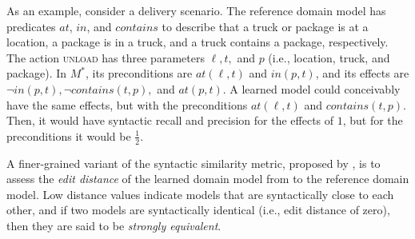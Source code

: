 \documentclass{article}
\theoremstyle{definition}
\theoremstyle{remark}
\newcommand{\realm}{{\ensuremath{M^*}}\xspace}
\newif\ifaddcomments
\newcommand{\roni}[1]{\ifaddcomments{\textcolor{red}{[Roni: #1]}}\fi}
\newcommand{\gregor}[1]{\ifaddcomments{\textcolor{orange}{[Gregor: #1]}}\fi}
\begin{document}
As an example, consider a delivery scenario.
The reference domain model has predicates $at$, $in$, and $contains$ to describe that a truck or package is at a location, a package is in a truck, and a truck contains a package, respectively.
The action \textsc{unload} has three parameters $\ell, t,$ and $p$ (i.e., location, truck, and package).
In $\realm$, its preconditions are $\textit{at}(\ell, t)$ and $\textit{in}(p,t)$, and its effects are $\neg \textit{in}(p,t), \neg \textit{contains}(t,p),$ and $\textit{at}(p,t)$.
A learned model could conceivably have the same effects, but with the preconditions $\textit{at}(\ell, t)$ and $\textit{contains}(t,p)$.
Then, it would have syntactic recall and precision for the effects of $1$, but for the preconditions it would be $\frac 1 2$.

A finer-grained variant of the syntactic similarity metric, proposed by \cite{chrpa2023comparing}, is to assess the \emph{edit distance} of the learned domain model from to the reference domain model. Low distance values indicate models that are syntactically close to each other, and if two models are syntactically identical (i.e., edit distance of zero), then they are said to be \textit{strongly equivalent}.







\end{document}
